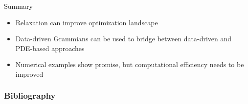 \documentclass{beamer}
\begin{document}
\begin{frame}{Summary}
\begin{itemize}
  \item Relaxation can improve optimization landscape
  \item Data-driven Grammians can be used to bridge between data-driven and PDE-based approaches
  \item Numerical examples show promise, but computational efficiency needs to be improved
\end{itemize}
\end{frame}


\begin{frame}
  \frametitle{Bibliography}
  \printbibliography %
\end{frame}
\end{document}

